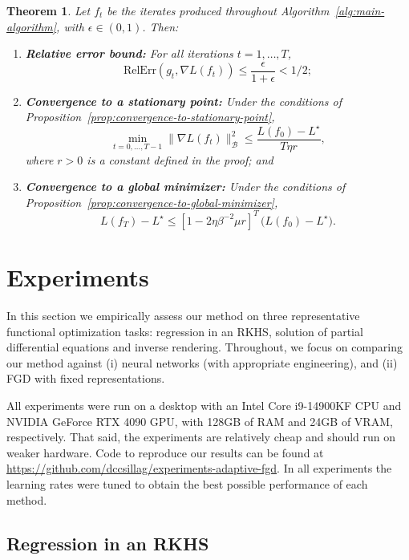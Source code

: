 \documentclass{article}
\newtheorem{theorem}{Theorem}[section]
\newcommand{\B}{\mathcal{B}}
\newcommand{\RelErr}{\mathrm{RelErr}}
\begin{document}
\begin{theorem}\label{thm:main-theorem}
    Let $f_t$ be the iterates produced throughout Algorithm~\ref{alg:main-algorithm}, with $\epsilon \in (0, 1)$. Then:
    \begin{enumerate}
        \item[(i)] \textbf{Relative error bound:}
            For all iterations $t = 1, \ldots, T$,
            \[ \RelErr( g_t, \nabla L(f_t) ) \leq \frac{\epsilon}{1+\epsilon} < 1/2; \]
        \item[(ii)] \textbf{Convergence to a stationary point:}
            Under the conditions of Proposition~\ref{prop:convergence-to-stationary-point},
            \[ \min_{t = 0, \ldots, T-1} \lVert \nabla L(f_t) \rVert_\B^2 \leq \frac{L(f_0) - L^\star}{T \eta r}, \]
            where $r>0$ is a constant defined in the proof; and
        \item[(iii)] \textbf{Convergence to a global minimizer:}
            Under the conditions of Proposition~\ref{prop:convergence-to-global-minimizer},
            \[
                L(f_T) - L^\star \leq [1 - 2 \eta \beta^{-2} \mu r]^T \, \bigl( L(f_0) - L^\star \bigr).
            \]
    \end{enumerate}
\end{theorem}

\section{Experiments}

In this section we empirically assess our method on three representative functional optimization tasks:
regression in an RKHS, solution of partial differential equations and inverse rendering.
Throughout, we focus on comparing our method against (i) neural networks (with appropriate engineering), and (ii) FGD with fixed representations.

All experiments were run on a desktop with an Intel Core i9-14900KF CPU and NVIDIA GeForce RTX 4090 GPU, with 128GB of RAM and 24GB of VRAM, respectively.
That said, the experiments are relatively cheap and should run on weaker hardware.
Code to reproduce our results can be found at \url{https://github.com/dccsillag/experiments-adaptive-fgd}.
In all experiments the learning rates were tuned to obtain the best possible performance of each method.

\subsection{Regression in an RKHS}\label{sec:exp1}
\end{document}
